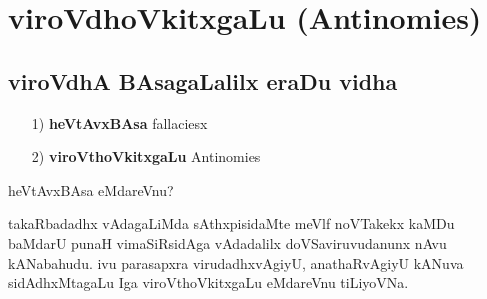 \chapter{viroVdhoVkitxgaLu (\rm Antinomies)}

\section*{viroVdhA BAsagaLalilx eraDu vidha}
\begin{itemize}
\item[{\rm 1)}] {\bf heVtAvxBAsa} {\rm fallaciesx}
\item[{\rm 2)}] {\bf viroVthoVkitxgaLu} {\rm Antinomies}
\end{itemize}

heVtAvxBAsa eMdareVnu?

takaRbadadhx vAdagaLiMda sAthxpisidaMte meVlf noVTakekx kaMDu baMdarU punaH vimaSiRsidAga vAdadalilx doVSaviruvudanunx nAvu kANabahudu. ivu parasapxra virudadhxvAgiyU, anathaRvAgiyU kANuva sidAdhxMtagaLu Iga viroVthoVkitxgaLu eMdareVnu tiLiyoVNa.

